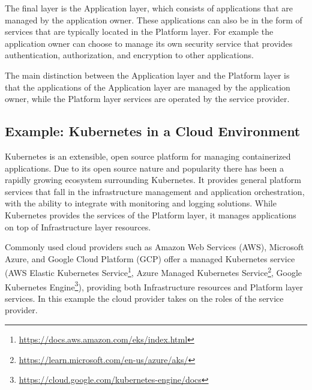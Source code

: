 The final layer is the Application layer, which consists of applications that
are managed by the application owner. These applications can also be in the form
of services that are typically located in the Platform layer. For example the
application owner can choose to manage its own security service that provides
authentication, authorization, and encryption to other applications.

The main distinction between the Application layer and the Platform layer is
that the applications of the Application layer are managed by the application
owner, while the Platform layer services are operated by the service provider.

\subsection{Example: Kubernetes in a Cloud Environment}
\label{sec:example-kubernetes}

Kubernetes is an extensible, open source platform for managing containerized
applications. Due to its open source nature and popularity there has been a
rapidly growing ecosystem surrounding Kubernetes. It provides general platform
services that fall in the infrastructure management and application
orchestration, with the ability to integrate with monitoring and logging
solutions. While Kubernetes provides the services of the Platform layer, it
manages applications on top of Infrastructure layer resources.

Commonly used cloud providers such as Amazon Web Services (AWS), Microsoft
Azure, and Google Cloud Platform (GCP) offer a managed Kubernetes service (AWS
Elastic Kubernetes
Service\footnote{\url{https://docs.aws.amazon.com/eks/index.html}}, Azure
Managed Kubernetes
Service\footnote{\url{https://learn.microsoft.com/en-us/azure/aks/}}, Google
Kubernetes
Engine\footnote{\url{https://cloud.google.com/kubernetes-engine/docs}}),
providing both Infrastructure resources and Platform layer services. In this
example the cloud provider takes on the roles of the service provider.


